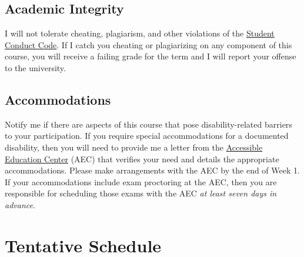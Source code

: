 \documentclass[10pt]{article}
\begin{document}
\subsection*{Academic Integrity} 

I will not tolerate cheating, plagiarism, and other violations of the \href{https://studentlife.uoregon.edu/conduct}{Student Conduct Code}. If I catch you cheating or plagiarizing on any component of this course, you will receive a failing grade for the term and I will report your offense to the university. 

\subsection*{Accommodations} 

Notify me if there are aspects of this course that pose disability-related barriers to your participation. If you require special accommodations for a documented disability, then you will need to provide me a letter from the \href{https://aec.uoregon.edu/}{Accessible Education Center} (AEC) that verifies your need and details the appropriate accommodations. Please make arrangements with the AEC by the end of Week 1. If your accommodations include exam proctoring at the AEC, then you are responsible for scheduling those exams with the AEC \textit{at least seven days in advance}.

\newpage
\section*{Tentative Schedule}
\end{document}
